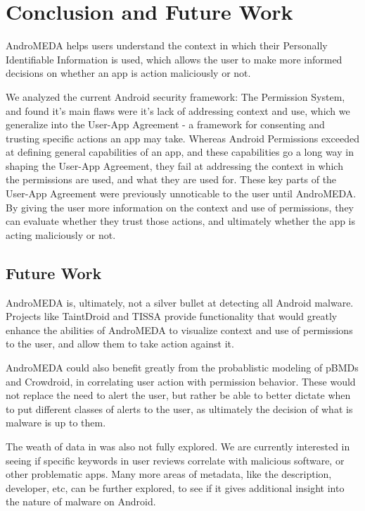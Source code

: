 \chapter{Conclusion and Future Work}
\label{sec:conclusion}
AndroMEDA helps users understand the context in which their Personally Identifiable Information is used, which allows the user to make more informed decisions on whether an app is action maliciously or not. 

We analyzed the current Android security framework: The Permission System, and found it's main flaws were it's lack of addressing context and use, which we generalize into the User-App Agreement - a framework for consenting and trusting specific actions an app may take. Whereas Android Permissions exceeded at defining general capabilities of an app, and these capabilities go a long way in shaping the User-App Agreement, they fail at addressing the context in which the permissions are used, and what they are used for. These key parts of the User-App Agreement were previously unnoticable to the user until AndroMEDA. By giving the user more information on the context and use of permissions, they can evaluate whether they trust those actions, and ultimately whether the app is acting maliciously or not.

\section{Future Work}
\label{sec:futurework}
AndroMEDA is, ultimately, not a silver bullet at detecting all Android malware. Projects like TaintDroid and TISSA provide functionality that would greatly enhance the abilities of AndroMEDA to visualize context and use of permissions to the user, and allow them to take action against it. 

AndroMEDA could also benefit greatly from the probablistic modeling of pBMDs and Crowdroid, in correlating user action with permission behavior. These would not replace the need to alert the user, but rather be able to better dictate when to put different classes of alerts to the user, as ultimately the decision of what is malware is up to them.

The weath of data in  was also not fully explored. We are currently interested in seeing if specific keywords in user reviews correlate with malicious software, or other problematic apps. Many more areas of metadata, like the description, developer, etc, can be further explored, to see if it gives additional insight into the nature of malware on Android.